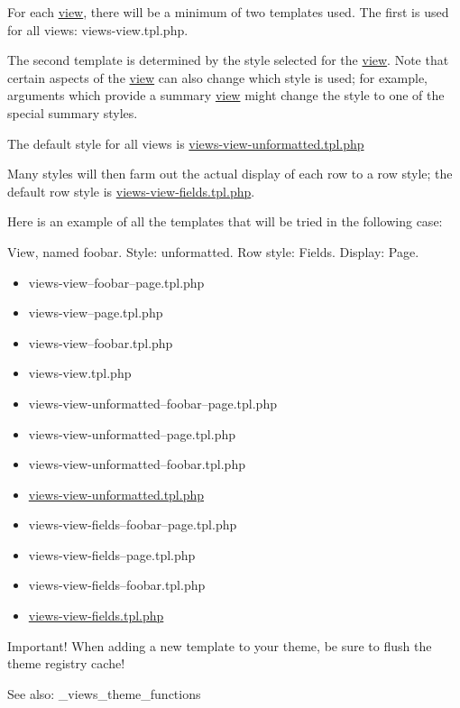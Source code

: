 For each \hyperlink{classview}{view}, there will be a minimum of two templates used. The first is used for all views: views-view.tpl.php.

The second template is determined by the style selected for the \hyperlink{classview}{view}. Note that certain aspects of the \hyperlink{classview}{view} can also change which style is used; for example, arguments which provide a summary \hyperlink{classview}{view} might change the style to one of the special summary styles.

The default style for all views is \hyperlink{views-view-unformatted_8tpl_8php}{views-view-unformatted.tpl.php}

Many styles will then farm out the actual display of each row to a row style; the default row style is \hyperlink{views-view-fields_8tpl_8php}{views-view-fields.tpl.php}.

Here is an example of all the templates that will be tried in the following case:

View, named foobar. Style: unformatted. Row style: Fields. Display: Page.

\begin{itemize}
\item views-view--foobar--page.tpl.php\item views-view--page.tpl.php\item views-view--foobar.tpl.php\item views-view.tpl.php\end{itemize}


\begin{itemize}
\item views-view-unformatted--foobar--page.tpl.php\item views-view-unformatted--page.tpl.php\item views-view-unformatted--foobar.tpl.php\item \hyperlink{views-view-unformatted_8tpl_8php}{views-view-unformatted.tpl.php}\end{itemize}


\begin{itemize}
\item views-view-fields--foobar--page.tpl.php\item views-view-fields--page.tpl.php\item views-view-fields--foobar.tpl.php\item \hyperlink{views-view-fields_8tpl_8php}{views-view-fields.tpl.php}\end{itemize}


Important! When adding a new template to your theme, be sure to flush the theme registry cache!

\begin{Desc}
\item[See also:]\_\-views\_\-theme\_\-functions \end{Desc}
